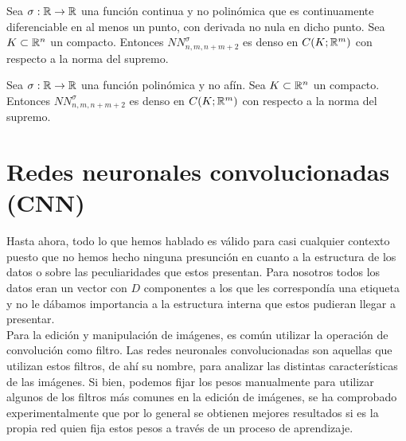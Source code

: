 \begin{itemize}
\begin{teorema}
Sea $\sigma : \mathbb{R} \to \mathbb{R}$ una función continua y no polinómica que es continuamente diferenciable en al menos un punto, con derivada no nula en dicho punto. Sea $K \subset \mathbb{R}^n$ un compacto. Entonces $NN_{n,m,n+m+2}^\sigma$ es denso en $C(K;\mathbb{R}^m)$ con respecto a la norma del supremo.
\end{teorema}

\begin{teorema}
Sea $\sigma : \mathbb{R} \to \mathbb{R}$ una función polinómica y no afín. Sea $K \subset \mathbb{R}^n$ un compacto. Entonces $NN_{n,m,n+m+2}^\sigma$ es denso en $C(K;\mathbb{R}^m)$ con respecto a la norma del supremo.
\end{teorema}

\chapter{Redes neuronales convolucionadas (CNN)} \label{ch:cnn}

Hasta ahora, todo lo que hemos hablado es válido para casi cualquier contexto puesto que no hemos hecho ninguna presunción en cuanto a la estructura de los datos o sobre las peculiaridades que estos presentan. Para nosotros todos los datos eran un vector con $D$ componentes a los que les correspondía una etiqueta y no le dábamos importancia a la estructura interna que estos pudieran llegar a presentar.\\

Para la edición y manipulación de imágenes, es común utilizar la operación de convolución como filtro. Las redes neuronales convolucionadas son aquellas que utilizan estos filtros, de ahí su nombre, para analizar las distintas características de las imágenes. Si bien, podemos fijar los pesos manualmente para utilizar algunos de los filtros más comunes en la edición de imágenes, se ha comprobado experimentalmente que por lo general se obtienen mejores resultados si es la propia red quien fija estos pesos a través de un proceso de aprendizaje.\\



\end{itemize}
